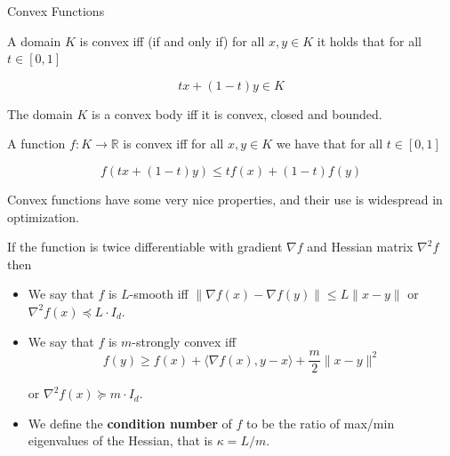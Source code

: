 \documentclass{beamer}
\begin{document}
\begin{frame}[allowframebreaks]{Convex Functions}

A domain $K$  is convex iff (if and only if) for all $x, y \in K$ it holds that for all $t \in [0, 1]$ 

$$tx + (1-t)y \in K$$

The domain $K$ is a convex body iff it is convex, closed and bounded. 

A function $f: K \to \mathbb R$ is convex iff for all $x, y \in K$ we have that for all $t \in [0, 1]$

$$
    f(tx + (1-t)y) \le t f(x) + (1-t) f(y)
$$

Convex functions have some very nice properties, and their use is widespread in optimization.  
    
\framebreak    
    
If the function is twice differentiable with gradient $\nabla f$ and Hessian matrix $\nabla^2 f$ then
\begin{itemize}
    \item We say that $f$ is $L$-smooth iff $\| \nabla f(x) - \nabla f(y) \| \le L \| x - y \|$ or $\nabla^2 f(x) \preceq L \cdot I_d$.
    \item We say that $f$ is $m$-strongly convex iff 
    $$f(y) \ge f(x) + \langle \nabla f(x), y - x \rangle + \frac m 2 \| x - y \|^2 $$
    
    or $\nabla^2 f(x) \succeq m \cdot I_d$.
    
    \item We define the \textbf{condition number} of $f$ to be the ratio of max/min eigenvalues of the Hessian, that is $\kappa = L / m$.
    
\end{itemize}
\end{frame}
\end{document}
